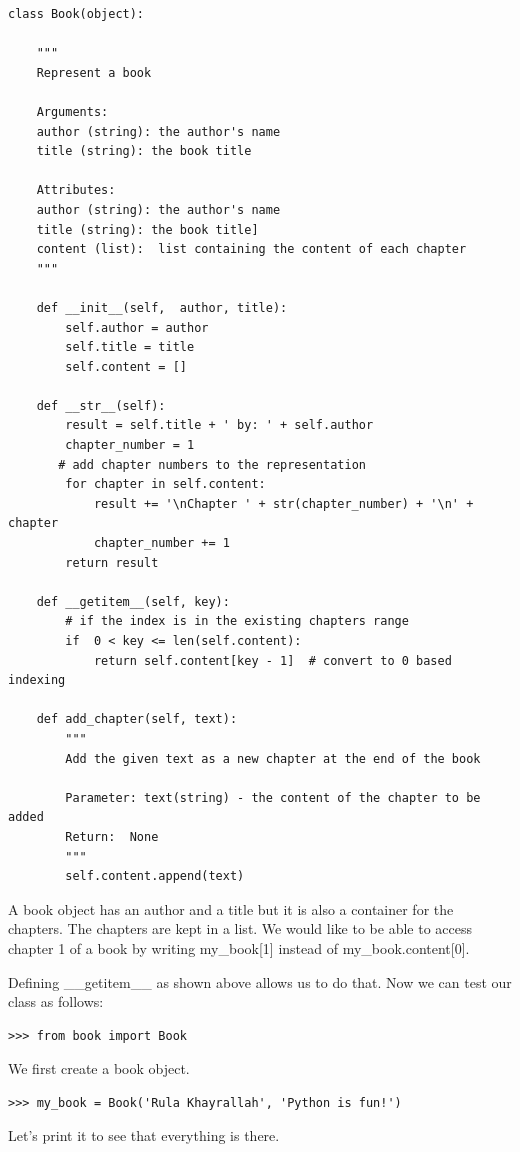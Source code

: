 \documentclass{article}
\begin{document}
\begin{lstlisting}
class Book(object):
 
    """
    Represent a book
 
    Arguments:
    author (string): the author's name
    title (string): the book title
 
    Attributes:
    author (string): the author's name
    title (string): the book title]
    content (list):  list containing the content of each chapter
    """
 
    def __init__(self,  author, title):
        self.author = author
        self.title = title
        self.content = []
 
    def __str__(self):
        result = self.title + ' by: ' + self.author
        chapter_number = 1
       # add chapter numbers to the representation
        for chapter in self.content:
            result += '\nChapter ' + str(chapter_number) + '\n' + chapter
            chapter_number += 1
        return result
 
    def __getitem__(self, key):
        # if the index is in the existing chapters range
        if  0 < key <= len(self.content):
            return self.content[key - 1]  # convert to 0 based indexing
 
    def add_chapter(self, text):
        """
        Add the given text as a new chapter at the end of the book
 
        Parameter: text(string) - the content of the chapter to be added
        Return:  None
        """
        self.content.append(text)
\end{lstlisting}

A book object has an author and a title but it is also a container for the chapters.  The chapters are kept in a list.  We would like to be able to access chapter 1 of a book by writing my{\_}book[1] instead of my{\_}book.content[0].

Defining {\_}{\_}getitem{\_}{\_} as shown above allows us to do that.  Now we can test our class as follows:

\begin{lstlisting}
>>> from book import Book
\end{lstlisting}

We first create a book object.

\begin{lstlisting}
>>> my_book = Book('Rula Khayrallah', 'Python is fun!')
\end{lstlisting}

Let's print it to see that everything is there.
\end{document}
